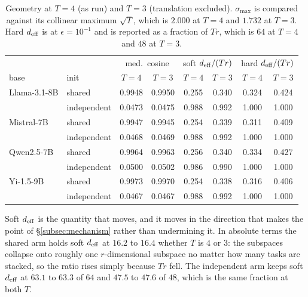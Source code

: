 \begin{table}[tb]
\centering
\small
\caption{Geometry at $T = 4$ (as run) and $T = 3$ (translation excluded).
$\sigma_{\max}$ is compared against its collinear maximum $\sqrt{T}$,
which is $2.000$ at $T=4$ and $1.732$ at $T=3$. Hard $d_{\mathrm{eff}}$ is at
$\epsilon = 10^{-1}$ and is reported as a fraction of $Tr$, which is $64$
at $T=4$ and $48$ at $T=3$.}
\label{tab:geometry-t3}
\begin{tabular}{llcccccc}
\toprule
 & & \multicolumn{2}{c}{med.\ cosine} & \multicolumn{2}{c}{soft $d_{\mathrm{eff}}/(Tr)$}
 & \multicolumn{2}{c}{hard $d_{\mathrm{eff}}/(Tr)$} \\
base & init & $T{=}4$ & $T{=}3$ & $T{=}4$ & $T{=}3$ & $T{=}4$ & $T{=}3$ \\
\midrule
Llama-3.1-8B & shared      & 0.9948 & 0.9950 & 0.255 & 0.340 & 0.324 & 0.424 \\
             & independent & 0.0473 & 0.0475 & 0.988 & 0.992 & 1.000 & 1.000 \\
\addlinespace
Mistral-7B   & shared      & 0.9947 & 0.9945 & 0.254 & 0.339 & 0.311 & 0.409 \\
             & independent & 0.0468 & 0.0469 & 0.988 & 0.992 & 1.000 & 1.000 \\
\addlinespace
Qwen2.5-7B   & shared      & 0.9964 & 0.9963 & 0.256 & 0.340 & 0.334 & 0.427 \\
             & independent & 0.0500 & 0.0502 & 0.986 & 0.990 & 1.000 & 1.000 \\
\addlinespace
Yi-1.5-9B    & shared      & 0.9973 & 0.9970 & 0.254 & 0.338 & 0.316 & 0.406 \\
             & independent & 0.0467 & 0.0467 & 0.988 & 0.992 & 1.000 & 1.000 \\
\bottomrule
\end{tabular}
\end{table}

Soft $d_{\mathrm{eff}}$ is the quantity that moves, and it moves in the direction
that makes the point of \S\ref{subsec:mechanism} rather than undermining
it. In absolute terms the shared arm holds soft $d_{\mathrm{eff}}$ at $16.2$ to
$16.4$ whether $T$ is $4$ or $3$: the subspaces collapse onto roughly one
$r$-dimensional subspace no matter how many tasks are stacked, so the
ratio rises simply because $Tr$ fell. The independent arm keeps soft
$d_{\mathrm{eff}}$ at $63.1$ to $63.3$ of $64$ and $47.5$ to $47.6$ of $48$, which is
the same fraction at both $T$.

